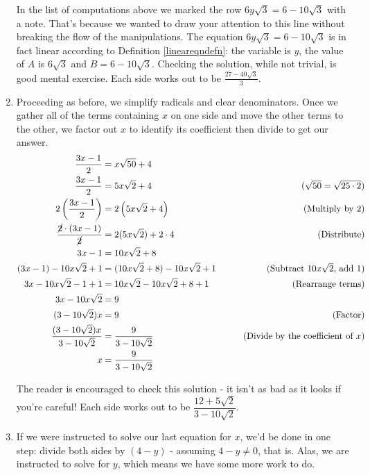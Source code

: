 \begin{ex}
\begin{enumerate}
In the list of computations above we marked the row $6 y \sqrt{3} = 6 - 10 \sqrt{3}$ with a note.  That's because we wanted to draw your attention to this line without breaking the flow of the manipulations.  The equation $6 y \sqrt{3} = 6 - 10 \sqrt{3}$ is in fact linear according to Definition \ref{lineareqndefn}: the variable is $y$, the value of $A$ is $6\sqrt{3}$ and $B = 6 - 10 \sqrt{3}$. Checking the solution, while not trivial, is good mental exercise.  Each side works out to be $\frac{27 - 40 \sqrt{3}}{3}$.

\item  Proceeding as before, we simplify radicals and clear denominators.  Once we gather all of the terms containing $x$ on one side and move the other terms to the other, we factor out $x$ to identify its coefficient then divide to get our answer.
\begin{align*}
\dfrac{3x-1}{2} & = x\sqrt{50} + 4 \\
\dfrac{3x-1}{2} & = 5x\sqrt{2} + 4 & \tag{$\sqrt{50} = \sqrt{25 \cdot 2}$} \\
2\left(\dfrac{3x-1}{2}\right) & = 2 \left(5x\sqrt{2} + 4 \right) & \tag{Multiply by $2$} \\
\dfrac{\cancel{2} \cdot (3x-1)}{\cancel{2}} & = 2 (5x \sqrt{2}) + 2\cdot 4 & \tag{Distribute} \\ 
3x - 1 & = 10x \sqrt{2} + 8 \\
(3x-1) - 10x\sqrt{2} + 1 & = (10x \sqrt{2} + 8) - 10x\sqrt{2} + 1 & \tag{Subtract $10x\sqrt{2}$,  add $1$} \\
3x - 10x\sqrt{2} - 1 + 1 & = 10x\sqrt{2} - 10x\sqrt{2} + 8 + 1 & \tag{Rearrange terms} \\
3x - 10x\sqrt{2} & = 9 \\
(3 - 10\sqrt{2}) x & = 9 & \tag{Factor} \\
\dfrac{(3 - 10\sqrt{2}) x}{3 - 10\sqrt{2}} & = \dfrac{9}{3 - 10\sqrt{2}} & \tag{Divide by the coefficient of $x$} \\
x & = \dfrac{9}{3 - 10\sqrt{2}} \\
\end{align*} 

The reader is encouraged to check this solution - it isn't as bad as it looks if you're careful! Each side works out to be $\dfrac{12 + 5\sqrt{2}}{3-10\sqrt{2}}$.

\item  If we were instructed to solve our last equation for $x$, we'd be done in one step: divide both sides by $(4-y)$ - assuming $4-y \neq 0$, that is.  Alas, we are instructed to solve for $y$, which means we have some more work to do.


\end{enumerate}
\end{ex}
